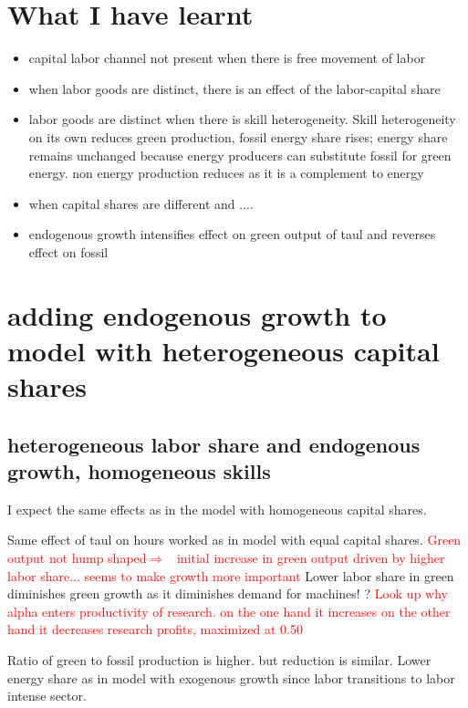 \documentclass[12pt]{article}
\newcommand{\ar}{$\Rightarrow$ \ }
\newcommand{\tr}[1]{\textcolor{red}{#1}}
\begin{document}
\clearpage \newpage 
\section{What I have learnt}
\begin{itemize}
	\item capital labor channel not present when there is free movement of labor
	\item when labor goods are distinct, there is an effect of the labor-capital share
	\item labor goods are distinct when there is skill heterogeneity. Skill heterogeneity on its own reduces green production, fossil energy share rises; energy share remains unchanged because energy producers can substitute fossil for green energy. non energy production reduces as it is a complement to energy
	\item when capital shares are different and ....
	\item endogenous growth intensifies effect on green output of taul and reverses effect on fossil 
\end{itemize}


\section{adding endogenous growth to model with heterogeneous capital shares}

\subsection{heterogeneous labor share and endogenous growth, homogeneous skills}
I expect the same effects as in the model with homogeneous capital shares. 

Same effect of taul on hours worked as in model with equal capital shares.
\tr{Green output not hump shaped\ar initial increase in green output driven by higher labor share... seems to make growth more important} Lower labor share in green diminishes green growth as it diminishes demand for machines! ? \tr{Look up why alpha enters productivity of research. on the one hand it increases on the other hand it decreases research profits, maximized at 0.50}

Ratio of green to fossil production is higher. but reduction is similar. Lower energy share as in model with exogenous growth since labor transitions to labor intense sector. 
\end{document}
